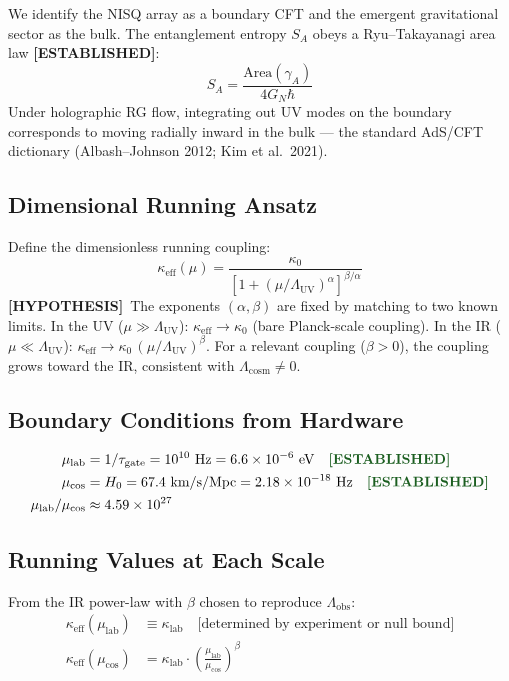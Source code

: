 \documentclass[11pt,letterpaper]{article}
\newcommand{\EST}{\textcolor{established}{\textbf{[ESTABLISHED]}}}
\newcommand{\HYP}{\textcolor{hypothesis}{\textbf{[HYPOTHESIS]}}}
\newcommand{\tgate}{\tau_{\mathrm{gate}}}
\newcommand{\mulab}{\mu_{\mathrm{lab}}}
\newcommand{\mucos}{\mu_{\mathrm{cos}}}
\begin{document}
We identify the NISQ array as a boundary CFT and the emergent gravitational sector as the bulk.
The entanglement entropy $S_A$ obeys a Ryu--Takayanagi area law \EST:
\begin{equation}
  S_A = \frac{\mathrm{Area}(\gamma_A)}{4 G_N \hbar}
\end{equation}
Under holographic RG flow, integrating out UV modes on the boundary corresponds to moving radially inward in the bulk --- the standard AdS/CFT dictionary (Albash--Johnson 2012; Kim et al.\ 2021).

\subsection{Dimensional Running Ansatz}

Define the dimensionless running coupling:
\begin{equation}
  \kappa_{\mathrm{eff}}(\mu) = \frac{\kappa_0}{\left[1 + \left(\mu/\Lambda_{\mathrm{UV}}\right)^\alpha\right]^{\beta/\alpha}}
  \label{eq:RG_ansatz}
\end{equation}
\HYP\ The exponents $(\alpha,\beta)$ are fixed by matching to two known limits.
In the UV ($\mu \gg \Lambda_{\mathrm{UV}}$): $\kappa_{\mathrm{eff}} \to \kappa_0$ (bare Planck-scale coupling).
In the IR ($\mu \ll \Lambda_{\mathrm{UV}}$): $\kappa_{\mathrm{eff}} \to \kappa_0\,(\mu/\Lambda_{\mathrm{UV}})^\beta$.
For a relevant coupling ($\beta > 0$), the coupling grows toward the IR, consistent with $\Lambda_{\mathrm{cosm}} \neq 0$.

\subsection{Boundary Conditions from Hardware}

\begin{align}
  \mulab &= 1/\tgate = 10^{10}\ \text{Hz} = 6.6 \times 10^{-6}\ \text{eV} \quad \text{\EST} \label{eq:mulab}\\
  \mucos &= H_0 = 67.4\ \text{km/s/Mpc} = 2.18 \times 10^{-18}\ \text{Hz} \quad \text{\EST} \label{eq:mucos}\\
  \mulab/\mucos &\approx 4.59 \times 10^{27} \label{eq:scaleratio}
\end{align}

\subsection{Running Values at Each Scale}

From the IR power-law with $\beta$ chosen to reproduce $\Lambda_{\mathrm{obs}}$:
\begin{align}
  \kappa_{\mathrm{eff}}(\mulab) &\equiv \kappa_{\mathrm{lab}} \quad \text{[determined by experiment or null bound]} \label{eq:klab}\\
  \kappa_{\mathrm{eff}}(\mucos) &= \kappa_{\mathrm{lab}} \cdot \left(\frac{\mulab}{\mucos}\right)^\beta \label{eq:kcos}
\end{align}
\end{document}
